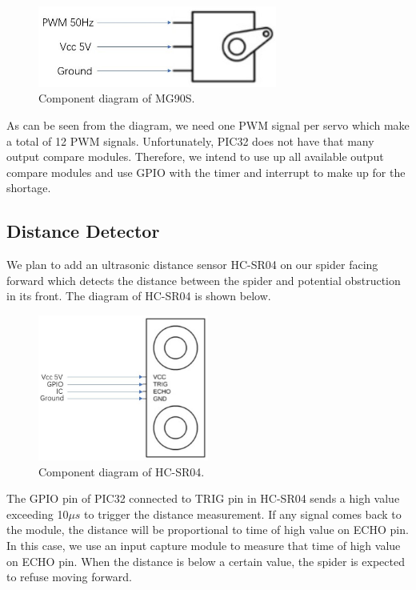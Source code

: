 \documentclass[a4paper]{article}
\begin{document}
\begin{figure}[H]
    \centering
    \includegraphics[width=0.7\textwidth]{servo.jpg}
    \caption{Component diagram of MG90S.}
\end{figure}

As can be seen from the diagram, we need one PWM signal per servo which make a total of 12 PWM signals. Unfortunately, PIC32 does not have that many output compare modules. Therefore, we intend to use up all available output compare modules and use GPIO with the timer and interrupt to make up for the shortage.

\subsection{Distance Detector}
We plan to add an ultrasonic distance sensor HC-SR04 on our spider facing forward which detects the distance between the spider and potential obstruction in its front. The diagram of HC-SR04 is shown below.
\begin{figure}[H]
    \centering
    \includegraphics[width=0.5\textwidth]{SR.jpg}
    \caption{Component diagram of HC-SR04.}
\end{figure}
The GPIO pin of PIC32 connected to TRIG pin in HC-SR04 sends a high value exceeding 10$\mu s$ to trigger the distance measurement. If any signal comes back to the module, the distance will be proportional to time of high value on ECHO pin. In this case, we use an input capture module to measure that time of high value on ECHO pin. When the distance is below a certain value, the spider is expected to refuse moving forward.
\end{document}
